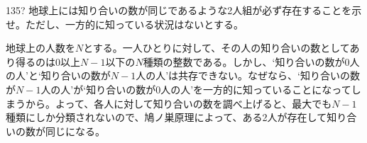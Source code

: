 \begin{thm}{135}{\hosi ?}{}
 地球上には知り合いの数が同じであるような2人組が必ず存在することを示せ。ただし、一方的に知っている状況はないとする。
\end{thm}

地球上の人数を$N$とする。一人ひとりに対して、その人の知り合いの数としてあり得るのは0以上$N-1$以下の$N$種類の整数である。しかし、`知り合いの数が0人の人'と`知り合いの数が$N-1$人の人'は共存できない。なぜなら、`知り合いの数が$N-1$人の人'が`知り合いの数が0人の人'を一方的に知っていることになってしまうから。よって、各人に対して知り合いの数を調べ上げると、最大でも$N-1$種類にしか分類されないので、鳩ノ巣原理によって、ある2人が存在して知り合いの数が同じになる。